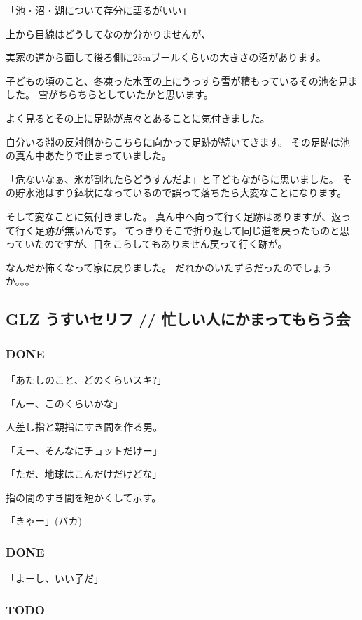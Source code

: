 \documentclass[11pt]{article}
\begin{document}
「池・沼・湖について存分に語るがいい」

上から目線はどうしてなのか分かりませんが、

実家の道から面して後ろ側に25mプールくらいの大きさの沼があります。

子どもの頃のこと、冬凍った水面の上にうっすら雪が積もっているその池を見ました。
雪がちらちらとしていたかと思います。

よく見るとその上に足跡が点々とあることに気付きました。

自分いる淵の反対側からこちらに向かって足跡が続いてきます。
その足跡は池の真ん中あたりで止まっていました。

「危ないなぁ、氷が割れたらどうすんだよ」と子どもながらに思いました。
その貯水池はすり鉢状になっているので誤って落ちたら大変なことになります。

そして変なことに気付きました。
真ん中へ向って行く足跡はありますが、返って行く足跡が無いんです。
てっきりそこで折り返して同じ道を戻ったものと思っていたのですが、目をこらしてもありません戻って行く跡が。

なんだか怖くなって家に戻りました。
だれかのいたずらだったのでしょうか。。。
\subsection{GLZ うすいセリフ // 忙しい人にかまってもらう会}
\label{sec-60_2}
\subsubsection{\textbf{DONE}}
\label{sec-60_2_1}

「あたしのこと、どのくらいスキ?」

「んー、このくらいかな」

人差し指と親指にすき間を作る男。

「えー、そんなにチョットだけー」

「ただ、地球はこんだけだけどな」

指の間のすき間を短かくして示す。

「きゃー」(バカ)
\subsubsection{\textbf{DONE}}
\label{sec-60_2_2}

「よーし、いい子だ」
\subsubsection{\textbf{TODO}}
\label{sec-60_2_3}
\end{document}

